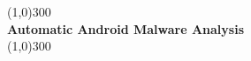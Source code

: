 
\begin{titlepage}
	\begin{center}
		\line(1,0){300}\\
		\huge{\bfseries Automatic Android Malware Analysis}\\
		\line(1,0){300}\\
	\end{center}
\end{titlepage}

